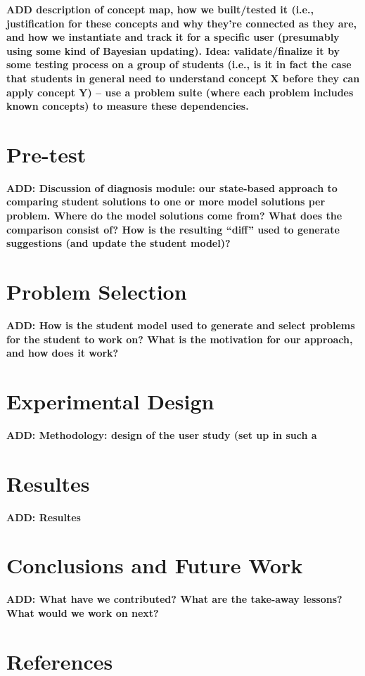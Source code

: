 \documentclass[twocolumn]{article}
\newcommand{\fix}[1]{{\bf #1}}
\begin{document}
\fix{ADD description of concept map, how we built/tested it 
(i.e., justification for these concepts and why they're
connected as they are, and how we instantiate and track it for a
specific user (presumably using some kind of Bayesian updating).  
Idea:  validate/finalize it by some testing process on
a group of students (i.e., is it in fact the case that students in
general need to understand concept X before they can apply concept Y)
-- use a problem suite (where each problem includes known concepts)
to measure these dependencies.} 


\section{Pre-test}
\label{sec:diagnosis}

\fix{ADD:  Discussion of diagnosis module:  our state-based
approach to comparing student solutions to one or more model
solutions per problem.  Where do the model solutions come from?
What does the comparison consist of?  How is the resulting
``diff'' used to generate suggestions (and update the student model)?}


\section{Problem Selection}
\label{sec:prob-selection}

\fix{ADD: How is the student model used to generate and select
  problems for the student to work on?  What is the motivation for our
  approach, and how does it work?}

\section{Experimental Design}
\label{sec:exper-design}

\fix{ADD:  Methodology:  design of the user study (set up in such a}

\section{Resultes}
\label{sec: resultes}

\fix{ADD: Resultes}


\section{Conclusions and Future Work}
\label{conclusions}

\fix{ADD:  What have we contributed?  What are the take-away lessons?
  What would we work on next?}
  
\section*{References}
\end{document}
